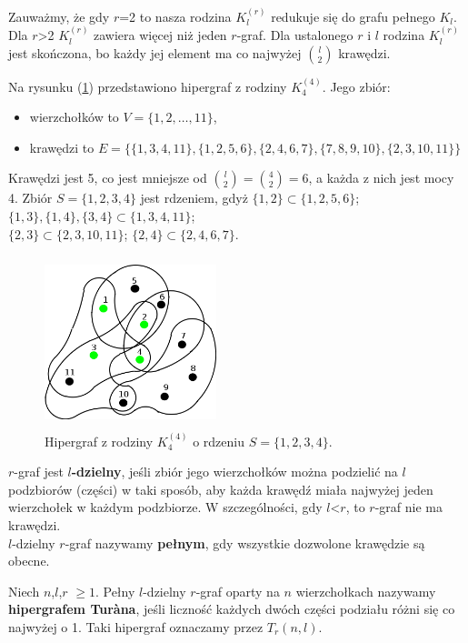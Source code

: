 \documentclass[miz,woman]{mgrwms}
\begin{document}
Zauważmy, że gdy $r$=2 to nasza rodzina $K_l^{(r)}$ redukuje się do grafu pełnego $K_l$. Dla $r$>2 $K_l^{(r)}$ zawiera więcej niż jeden $r$-graf.
Dla ustalonego $r$ i $l$ rodzina $K_l^{(r)}$ jest skończona, bo każdy jej element ma co najwyżej $l \choose 2$ krawędzi.\\
\begin{przy}
Na rysunku (\ref{rdzen}) przedstawiono hipergraf z rodziny $K_4^{(4)}$. Jego zbiór:
\begin{itemize}
 \item wierzchołków to $V=\{1,2,\dots,11\}$,
 \item krawędzi to  $E=\{ \{ 1,3,4,11\}, \{1,2,5,6\},\{2,4,6,7\},\{7,8,9,10\},\{2,3,10,11\}\}$
\end{itemize}
 Krawędzi jest 5, co jest mniejsze od $ {{l} \choose {2}}={{4}\choose{2}}=6$, a każda z nich jest mocy 4. Zbiór $S=\{1,2,3,4\}$
jest rdzeniem, gdyż $\{1,2\} \subset \{1,2,5,6\}$; $\{1,3\},\{1,4\}, \{3,4\} \subset \{ 1,3,4,11\}$;\\
$\{2,3\}\subset \{2,3,10,11\}$; $\{2,4\} \subset \{2,4,6,7\}$.


\begin{figure}[h]
\centering
\includegraphics[width=5cm, height=5cm]{rdzen.png}
   \caption{Hipergraf z rodziny $K_4^{(4)}$ o rdzeniu $S=\{1,2,3,4\}$.}
    \label{rdzen}
\end{figure}
\end{przy}

\begin{defi}
  $r$-graf jest \textbf{$l$-dzielny}, jeśli zbiór jego wierzchołków można podzielić na $l$ podzbiorów (części) w taki sposób, aby
każda krawędź miała najwyżej jeden wierzchołek w każdym podzbiorze.
W szczególności, gdy $l$<$r$, to $r$-graf nie ma krawędzi.\\
$l$-dzielny $r$-graf nazywamy \textbf{pełnym}, gdy wszystkie dozwolone krawędzie są obecne.
\end{defi}
\begin{defi}
Niech $n$,$l$,$r$ $\geq 1$. Pełny $l$-dzielny $r$-graf oparty na $n$ wierzchołkach nazywamy \textbf{hipergrafem Tur\`{a}na},
jeśli liczność każdych dwóch części podziału różni się co najwyżej o 1. Taki hipergraf oznaczamy przez $T_r(n,l)$.
\end{defi}
\end{document}
